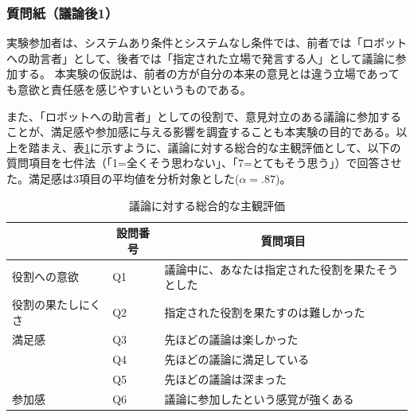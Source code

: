 \documentclass[11pt, a4paper]{jreport} %
\begin{document}




\subsubsection*{質問紙（議論後1）}
実験参加者は、システムあり条件とシステムなし条件では、前者では「ロボットへの助言者」として、後者では「指定された立場で発言する人」として議論に参加する。
本実験の仮説は、前者の方が自分の本来の意見とは違う立場であっても意欲と責任感を感じやすいというものである。

また、「ロボットへの助言者」としての役割で、意見対立のある議論に参加することが、満足感や参加感に与える影響を調査することも本実験の目的である。以上を踏まえ、表\ref{tab:indev}に示すように、議論に対する総合的な主観評価として、以下の質問項目を七件法（「1=全くそう思わない」、「7=とてもそう思う」）で回答させた。満足感は3項目の平均値を分析対象とした($\alpha=.87$)。


\begin{table}[H]
\caption{議論に対する総合的な主観評価}
\centering
\label{tab:indev}
\begin{tabular}{@{}lll@{}}
\toprule
\multicolumn{1}{c}{} & \multicolumn{1}{c}{設問番号}&\multicolumn{1}{c}{質問項目}　\\ \midrule
役割への意欲             &Q1   & 議論中に、あなたは指定された役割を果たそうとした \\
役割の果たしにくさ                   &Q2  & 指定された役割を果たすのは難しかった       \\
満足感            &Q3      & 先ほどの議論は楽しかった             \\
                  &Q4   & 先ほどの議論に満足している            \\
                  &Q5   & 先ほどの議論は深まった              \\
参加感              &Q6    & 議論に参加したという感覚が強くある        \\
\bottomrule
\end{tabular}
\end{table}
\end{document}

